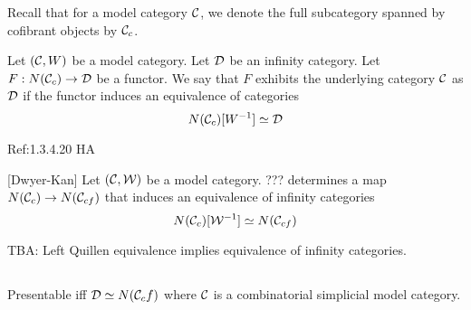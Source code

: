 \documentclass[a4paper]{article}
\begin{document}
Recall that for a model category $\mathcal{C}$, we denote the full subcategory spanned by cofibrant objects by $\mathcal{C}_c$. 

\begin{defn}{}{} Let $(\mathcal{C},W)$ be a model category. Let $\mathcal{D}$ be an infinity category. Let $F:N(\mathcal{C}_c)\to\mathcal{D}$ be a functor. We say that $F$ exhibits the underlying category $\mathcal{C}$ as $\mathcal{D}$ if the functor induces an equivalence of categories $$N(\mathcal{C}_c)[W^{-1}]\simeq\mathcal{D}$$
\end{defn}

Ref:1.3.4.20 HA

\begin{thm}{[Dwyer-Kan]}{} Let $(\mathcal{C},\mathcal{W})$ be a model category. ??? determines a map $N(\mathcal{C}_c)\to N(\mathcal{C}_{cf})$ that induces an equivalence of infinity categories $$N(\mathcal{C}_c)[\mathcal{W}^{-1}]\simeq N(\mathcal{C}_{cf})$$
\end{thm}

TBA: Left Quillen equivalence implies equivalence of infinity categories. 

\subsection{}
Presentable iff $\mathcal{D}\simeq N(\mathcal{C}_cf)$ where $\mathcal{C}$ is a combinatorial simplicial model category. 
\end{document}
